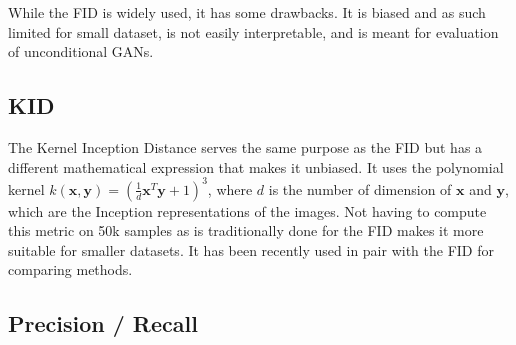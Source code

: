 While the FID is widely used, it has some drawbacks. It is biased and as such limited for small dataset, is not easily interpretable, and is meant for evaluation of unconditional GANs.

\subsection{\acs{KID}}

The Kernel Inception Distance serves the same purpose as the \ac{FID} but has a different mathematical expression that makes it unbiased. It uses the polynomial kernel $k(\mathbf{x},\mathbf{y}) = \left(\frac{1}{d}\mathbf{x}^T\mathbf{y} + 1\right)^3$, where $d$ is the number of dimension of $\mathbf{x}$ and $\mathbf{y}$, which are the Inception representations of the images. Not having to compute this metric on 50k samples as is traditionally done for the \ac{FID} makes it more suitable for smaller datasets. It has been recently used in pair with the \ac{FID} for comparing methods.

\subsection{Precision / Recall}

